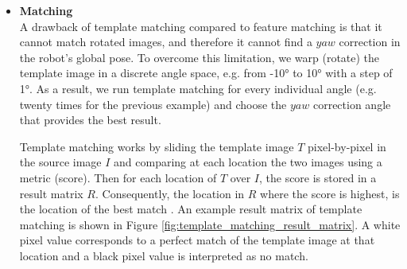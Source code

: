 \begin{itemize}
        Finally, we replace unknown cell values, i.e. cells that do not
        contain an elevation value, with zero since the matching
        method we use cannot handle unknown values. It is also possible
        to mask these values during matching. In any case, zero values
        do not contribute to the outcome of the match as it is explained
        in the next step.
        Figure \ref{fig:elevation_and_gradient_images} depicts the elevation
        image (map) as well as its gradient image.

        \begin{figure}[t]
            \centering
            \begin{subfigure}{0.5\textwidth}
                \centering
                \texttt{[image: elevation\_image]}
                \caption{Raw elevation image}
                \label{fig:elevation_image}
            \end{subfigure}%
            \begin{subfigure}{0.5\textwidth}
                \centering
                \texttt{[image: gradient\_image]}
                \caption{Gradient of elevation image}
                \label{fig:gradient_image}
            \end{subfigure}
            \caption[Raw elevation and gradient images]{
                The raw elevation image of the map and its gradient
                after applying the Sobel operator.}
            \label{fig:elevation_and_gradient_images}
        \end{figure}

    \item \textbf{Matching} \\
        A drawback of template matching compared to feature matching is that
        it cannot match rotated images, and therefore it cannot find a
        $yaw$ correction in the robot's global pose.
        To overcome this limitation, we warp (rotate) the template image
        in a discrete angle space, e.g. from \ang{-10} to \ang{10} with
        a step of \ang{1}. As a result, we run template matching for every
        individual angle (e.g. twenty times for the previous example) and
        choose the $yaw$ correction angle that provides the best result.

        Template matching works by sliding the template image $T$
        pixel-by-pixel in the source image $I$ and comparing at each
        location the two images using a metric (score).
        Then for each location of $T$ over $I$, the score is stored in a
        result matrix $R$.
        Consequently, the location in $R$ where the score is highest,
        is the location of the best match \parencite{Hashemi2016}.
        An example result matrix of template matching is shown in
        Figure \ref{fig:template_matching_result_matrix}.
        A white pixel value corresponds to a perfect match of the template
        image at that location and a black pixel value is interpreted as
        no match.


\end{itemize}
